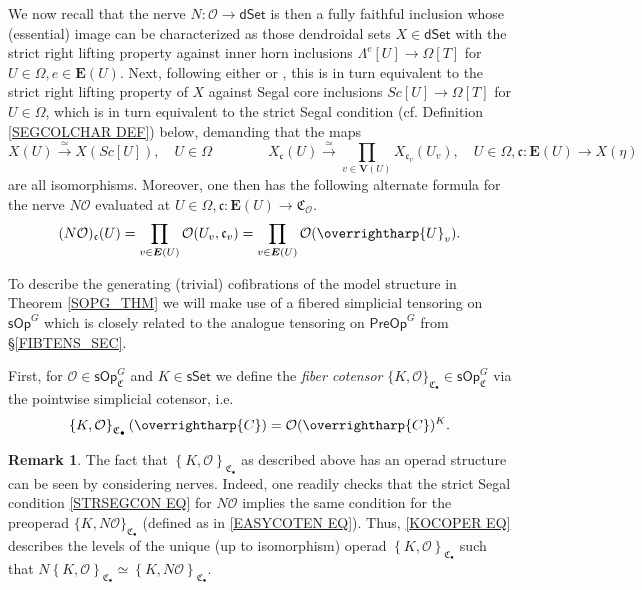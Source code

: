 \documentclass[a4paper,10pt
,draft
]{article}%
\numberwithin{equation}{section}
\numberwithin{figure}{section}
\theoremstyle{definition} %
\newtheorem{remark}[equation]{Remark}%
\newcommand{\set}[1]{\left\{#1\right\}}%
\newcommand{\vect}[1]{\text{\overrightharp{\ensuremath{#1}}}}
\renewcommand{\O}{\ensuremath{\mathcal O}}
\newcommand{\1}{\ensuremath{\mathbbm 1}}%
\begin{document}
We now recall \cite[Prop. 5.3 and Thm. 6.1]{MW09}
that the nerve
$N \colon \mathsf{\O} \to \mathsf{dSet}$
is then a fully faithful inclusion
whose (essential) image can be characterized
as those
dendroidal sets $X \in \mathsf{dSet}$
with the strict right lifting property against inner horn inclusions
$\Lambda^e[U] \to \Omega[T]$ for $U\in\Omega,e\in \boldsymbol{E}(U)$.
Next,
following either \cite[Prop. 2.5 and Cor. 2.6]{CM13a}
or \cite[Props. 3.22 and 3.31]{BP_edss},
this is in turn equivalent to the strict right lifting property of $X$
against Segal core inclusions
$Sc[U] \to \Omega[T]$ for $U \in \Omega$,
which is in turn equivalent to the strict Segal condition
(cf. Definition \ref{SEGCOLCHAR DEF}) below,
demanding that the maps
\begin{equation}\label{STRSEGCON EQ}
	X(U)
	\xrightarrow{\simeq}
	X(Sc[U]),
	\quad
	U \in \Omega
\qquad \qquad
	X_{\mathfrak{c}}(U) 
	\xrightarrow{\simeq}
	\prod_{v \in \boldsymbol{V}(U)}
	X_{\mathfrak{c}_v}(U_v),
	\quad
	U \in \Omega,
	\mathfrak{c} \colon 
	\boldsymbol{E}(U) \to X(\eta)
\end{equation}
are all isomorphisms.
Moreover, one then has the following alternate formula for the nerve
$N \O$ evaluated at
$U\in \Omega,
\mathfrak{c} \colon \boldsymbol{E}(U) \to \mathfrak{C}_{\O}$.
\begin{equation}\label{ALTNER EQ}
	(N \O)_{\mathfrak{c}} (U) 
	= 
	\prod_{v \in \boldsymbol{E}(U)}
	\O(U_v,\mathfrak{c}_v)
	=
	\prod_{v \in \boldsymbol{E}(U)}
	\O(\vect{U}_v).
\end{equation}



To describe the generating (trivial) cofibrations of 
the model structure in Theorem \ref{SOPG_THM}
we will make use of a fibered simplicial tensoring on
$\mathsf{sOp}^G$
which is closely related to the analogue tensoring on
$\mathsf{PreOp}^G$
from \S \ref{FIBTENS_SEC}.

First, for $\O \in \mathsf{sOp}^G_{\mathfrak{C}}$
and 
$K \in \mathsf{sSet}$
we define the \emph{fiber cotensor}
$\{K,\O\}_{\mathfrak{C}_{\bullet}} 
\in \mathsf{sOp}^G_{\mathfrak{C}}$
via the pointwise simplicial cotensor, i.e.
\begin{equation}\label{KOCOPER EQ}
	\set{K, \O}_{\mathfrak{C}_{\bullet}} (\vect C) = \O(\vect C)^K.
\end{equation}


\begin{remark}\label{NERTENID REM}
	The fact that 
	$\set{K, \O}_{\mathfrak{C}_{\bullet}}$
	as described above has an operad structure
	can be seen by considering nerves. 
	Indeed, 
	one readily checks that the strict Segal condition
	\eqref{STRSEGCON EQ} for $N\O$
	implies the same condition for 
	the preoperad
	$\{K,N \O\}_{\mathfrak{C}_{\bullet}}$
	(defined as in \eqref{EASYCOTEN EQ}).
	Thus, \eqref{KOCOPER EQ}
	describes the levels
	of the unique (up to isomorphism) operad
	$\set{K, \O}_{\mathfrak{C}_{\bullet}}$
	such that
	$N \set{K, \O}_{\mathfrak{C}_{\bullet}} 
	\simeq
	\set{K, N \O}_{\mathfrak{C}_{\bullet}}$.
\end{remark}
\end{document}
